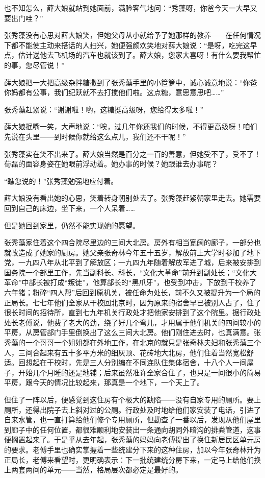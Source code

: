\par 也不知怎么，薛大娘就站到她面前，满脸客气地问：“秀藻呀，你爸今天一大早又要出门哇？”
\par 张秀藻没有心思对薛大娘笑，但她父母从小就给予了她那样的教养——在任何情况下都不能使主动来搭话的人扫兴，她便强颜欢笑地对薛大娘说：“是呀，吃完这早点，估计送他去飞机场的汽车也就该到了。薛大娘，您家大喜呀！有什么要我帮忙的事，您尽管说！”
\par 薛大娘把一大把高级杂拌糖撒到了张秀藻手里的小笸箩中，诚心诚意地说：“你爸你妈都有公事，我们纪跃就不去打搅他们啦。这点糖，意思意思吧……”
\par 张秀藻赶紧说：“谢谢啦！哟，这糖挺高级呀，您给得太多啦！”
\par 薛大娘抿嘴一笑，大声地说：“唉，过几年你还我们的时候，不得更高级呀！咱们先说在头里——到时候你就给这么点儿，我们还不干呢！”
\par 张秀藻实在笑不出来了。薛大娘当然是百分之一百的善意，但她受不了，受不了！荀磊的面容身姿在她眼前浮动着。她办事的时候？她跟谁去办事呢？
\par “瞧您说的！”张秀藻勉强地应付着。
\par 薛大娘没有看出她的心思，笑着转身朝别处去了。张秀藻赶紧朝家里走去。她需要回到自己的床边，坐下来，一个人呆着……
\par 但是她回到家里，仍然不能实现她的愿望。
\par 张秀藻家住着这个四合院尽里边的三间大北房。房外有相当宽阔的廊子，一部分也就改造成了她家的厨房。她父亲张奇林今年五十五岁，解放前上大学时参加了地下党，一九四八年从北平到了解放区；一九四九年随着解放军进了城，后来被安排到国务院一个部里工作，先当副科长、科长，“文化大革命”前升到副处长；“文化大革命”中部长被打成“叛徒”，他算部长的“黑爪牙”，也受到冲击，下放到干校养了六年猪；粉碎“四人帮”后回到原机关，被任命为处长，前不久又被提升为一个局的正局长。七七年他们全家从干校回北京时，因为原来的宿舍早已被别人占了，住了很长时间的招待所，直到七九年机关行政处才把他家安排到了这个院里。据行政处处长老傅说，他费了老大的劲，绕了好几个弯儿，才用属于他们机关的四间较小的平房，从房管部门手里倒换出了这么三间大北房。他们刚住进去时，也真满意。张秀藻的一个哥哥一个姐姐都在外地工作，在北京的就只是张奇林夫妇和张秀藻三个人，三间合起来有五十多平方米的细灰顶、花砖地大北房，他们住着当然宽松舒适。回想起在干校时，先是三人分别编在不同连队住集体宿舍，十八个人一间屋子，开始几个月睡的还是地铺；后来虽然准许全家合住了，也只是一间很小的简易平房，跟今天的情况比较起来，那真是一个地下，一个天上了。
\par 但住了一阵以后，便感觉到这住房有个极大的缺陷——没有自家专用的厕所。要上厕所，还得出院子去上斜对过的公厕。行政处及时地给他们家安装了电话，引进了自来水管，也一直打算给他们修个专用厕所，但勘查了一番以后，发现从他们屋里到廊子中的任何位置，都很难顺利地安装出一条通向胡同外暗沟的排粪管道，这事便搁置起来了。于是乎从去年起，张秀藻的妈妈向老傅提出了换住新居民区单元房的要求。老傅手里也确实掌握着一些统建分下来的这种住房，加以今年张奇林升为正局长，老傅来看望时，更明确表示：下一批统建统分房下来，一定马上给他们换上两套两间的单元——当然，格局层次都必定是最好的。
